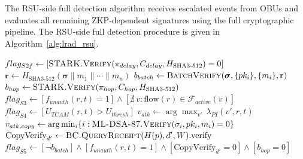 \documentclass[12pt, a4paper]{report}
\begin{document}
The \ac{RSU}-side full detection algorithm receives escalated
events from \ac{OBU}s and evaluates all remaining
\ac{ZKP}-dependent signatures using the full cryptographic
pipeline. The \ac{RSU}-side full detection procedure is given
in Algorithm~\ref{alg:lrad_rsu}.

\begin{algorithm}[H]
\caption{\ac{RSU} Full Detection (\texttt{LRAD-RSU})}
\begin{algorithmic}[1]
\small
{}
  \State $flag_{S2f} \gets
         [\textsc{STARK.Verify}(\pi_{delay},
         C_{delay}, H_{\text{SHA3-512}}) = 0]$
         \hfill{}
  \State $\mathbf{r} \gets
         H_{\text{SHA3-512}}(\boldsymbol{\sigma}
         \| m_1 \| \cdots \| m_n)$
         \hfill{}
  \State $b_{batch} \gets
         \textsc{BatchVerify}(\boldsymbol{\sigma},
         \{pk_i\}, \{m_i\}, \mathbf{r})$
         \hfill{}
  \State $b_{hop} \gets
         \textsc{STARK.Verify}(\pi_{hop},
         C_{hop}, H_{\text{SHA3-512}})$
         \hfill{}
 \State $flag_{S3} \gets
         [f_{unauth}(r,t){=}1]
         \land[\nexists\,v{:}\text{flow}(r)
         {\in}\mathcal{F}_{active}(v)]$
         \hfill{}
  \State $flag_{S4} \gets
         [U_{TCAM}(r,t){>}U_{thresh}]$
         \hfill{}
  \State $v_{atk} \gets
         \arg\max_{v'}\,\lambda_{PI}(v',r,t)$
         \hfill{}
    \State $v_{atk,copy} \gets
           \arg\min_{i}\{i :
           \textsc{ML-DSA-87.Verify}
           (\sigma_i,pk_i,m_i)=0\}$
           \hfill{}
  \EndIf
  \State $\text{CopyVerify}_{d'} \gets
         \textsc{BC.QueryReceipt}(H(p),d',W).\text{verify}$
         \hfill{}
  \State $flag_{S5} \gets
         [\neg b_{batch}]
         \land[f_{unauth}(r,t){=}1]
         \land[\text{CopyVerify}_{d'}{=}0]
         \land[b_{hop}{=}0]$

\end{algorithmic}
\end{algorithm}
\end{document}

